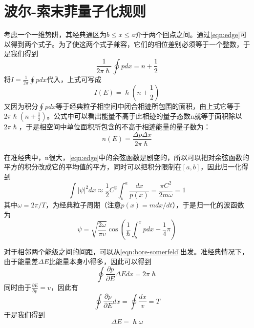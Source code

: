 \documentclass[12pt, a4paper, oneside]{ctexbook}
\newcommand{\hl}[1]{\hlbox{#1}}
\newcounter{#2}
\newcounter{#2}[#1]
\numberwithin{#2}{#1}
\newcommand{\xkuo}[1]{\left(#1\right)}
\newcommand{\pian}[2]{\frac{\partial #1}{\partial #2}}
\newcommand{\ji}[2]{\int_{#1}^{#2}}
\begin{document}
            \section{波尔-索末菲量子化规则}
            \begin{deduce}
              考虑一个一维势阱，其经典通区为\(b\leqslant x\leqslant a\)介于两个回点之间。通过\autoref{eqn:edge}可以得到两个式子。为了使这两个式子兼容，它们的相位差别必须等于一个整数，于是我们得到
              \begin{equation}\label{eqn:bore-somerfeld}
                \frac{1}{2\pi\hslash}\oint pdx=n+\frac12
              \end{equation}
              将\hl{浸渐不变量}\(I=\frac1{2\pi}\oint p dx\)代入，上式可写成
              \begin{equation}
                I(E)=\hslash\xkuo{n+\frac12}
              \end{equation}
              又因为积分\(\oint pdx\)等于经典粒子相空间中闭合相迹所包围的面积，由上式它等于\(2\pi\hslash\xkuo{n+\frac12}\)。公式中可以看出能量不高于此相迹的量子态数n就等于面积除以\(2\pi\hslash\)，于是相空间中单位面积所包含的不高于相迹能量的量子数为：
              \begin{equation}
                n(E)=\frac{\Delta p\Delta x}{2\pi\hslash}
              \end{equation}
            \end{deduce}
            \begin{deduce}
              在准经典中，n很大，\autoref{eqn:edge}中的余弦函数是剧变的，所以可以把对余弦函数的平方的积分改成它的平均值的平方，同时可以把积分限制在\([a,b]\)，因此归一化得到
              \begin{equation*}
                \int|\psi|^2dx\approx\frac12C^2\ji ba\frac{dx}{p(x)}=\frac{\pi C^2}{2m\omega}=1
              \end{equation*}
              其中\(\omega=2\pi/T\)，为经典粒子周期（注意\(p(x)=mdx/dt\)），于是归一化的波函数为
              \begin{equation}
                \psi=\sqrt{\frac{2\omega}{\pi v}}\cos\xkuo{\frac1\hslash\ji bx pdx-\frac14\pi}
              \end{equation}
            \end{deduce}
            \begin{deduce}
              对于相邻两个能级之间的间距，可以从\autoref{eqn:bore-somerfeld}出发。准经典情况下，由于能量差\(\Delta E\)比能量本身小得多，因此可以得到
              \begin{equation*}
                \oint \pian pE\Delta Edx=2\pi\hslash
              \end{equation*}
              同时由于\(\pian Ep=v\)，因此有
              \begin{equation*}
                \oint \pian pEdx=\oint \frac{dx}{v}=T
              \end{equation*}
              于是我们得到
              \begin{equation}\label{eqn:sc-DeltaE}
                \Delta E=\hslash\omega
              \end{equation}
            \end{deduce}
\end{document}
